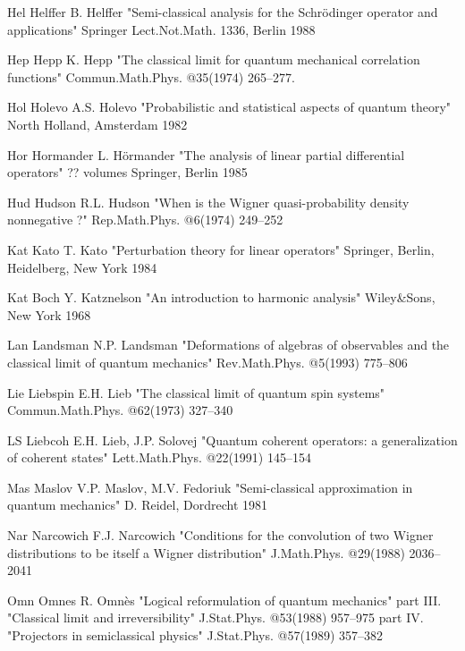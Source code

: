 \REF Hel Helffer \Bref
    B. Helffer
    "Semi-classical analysis for the Schr\"odinger operator and
    applications"
    Springer Lect.Not.Math. 1336, Berlin 1988

\REF Hep Hepp \Jref
    K. Hepp
    "The classical limit for quantum mechanical correlation
     functions"
    Commun.Math.Phys. @35(1974) 265--277.

\REF Hol Holevo \Bref
    A.S. Holevo
    "Probabilistic and statistical aspects of quantum theory"
    North Holland, Amsterdam 1982

\REF Hor Hormander \Bref
    L. H\"ormander
    "The analysis of linear partial differential operators"
    ?? volumes
    Springer, Berlin 1985

\REF Hud Hudson \Jref
    R.L. Hudson
    "When is the Wigner quasi-probability density nonnegative ?"
    Rep.Math.Phys. @6(1974) 249--252

\REF Kat Kato    \Bref
    T. Kato
    "Perturbation theory for linear operators"
    Springer, Berlin, Heidelberg, New York 1984

\REF Kat Boch  \Bref
    Y. Katznelson
    "An introduction to harmonic analysis"
    Wiley\&Sons, New York 1968

\REF Lan Landsman \Jref
    N.P. Landsman
    "Deformations of algebras of observables and the classical limit
    of quantum mechanics"
    Rev.Math.Phys. @5(1993) 775--806

\REF Lie Liebspin \Jref
    E.H. Lieb
    "The classical limit of quantum spin systems"
    Commun.Math.Phys. @62(1973) 327--340

\REF LS Liebcoh \Jref
    E.H. Lieb, J.P. Solovej
    "Quantum coherent operators: a generalization of coherent
    states"
    Lett.Math.Phys. @22(1991) 145--154

\REF Mas Maslov \Bref
    V.P. Maslov, M.V. Fedoriuk
    "Semi-classical approximation in quantum mechanics"
    D. Reidel, Dordrecht 1981

\REF Nar Narcowich \Jref
    F.J. Narcowich
    "Conditions for the convolution of two Wigner distributions to
    be itself a Wigner distribution"
    J.Math.Phys. @29(1988) 2036--2041

\REF Omn Omnes \Gref
    R. Omn\`es
    "Logical reformulation of quantum mechanics"
    \more    \Jref part III\eat. {}
    "Classical limit and irreversibility"
    J.Stat.Phys. @53(1988) 957--975
    \more    \Jref part IV\eat. {}
    "Projectors in semiclassical physics"
    J.Stat.Phys. @57(1989) 357--382

